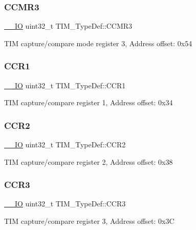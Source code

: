 \subsubsection{\texorpdfstring{CCMR3}{CCMR3}}
{\footnotesize\ttfamily \mbox{\hyperlink{core__sc300_8h_aec43007d9998a0a0e01faede4133d6be}{\+\_\+\+\_\+\+IO}} uint32\+\_\+t T\+I\+M\+\_\+\+Type\+Def\+::\+C\+C\+M\+R3}

T\+IM capture/compare mode register 3, Address offset\+: 0x54 \mbox{\label{struct_t_i_m___type_def_a0dd9c06729a5eb6179c6d0d60faca7ed}} 
\subsubsection{\texorpdfstring{CCR1}{CCR1}}
{\footnotesize\ttfamily \mbox{\hyperlink{core__sc300_8h_aec43007d9998a0a0e01faede4133d6be}{\+\_\+\+\_\+\+IO}} uint32\+\_\+t T\+I\+M\+\_\+\+Type\+Def\+::\+C\+C\+R1}

T\+IM capture/compare register 1, Address offset\+: 0x34 \mbox{\label{struct_t_i_m___type_def_a4d1171e9a61538424b8ef1f2571986d0}} 
\subsubsection{\texorpdfstring{CCR2}{CCR2}}
{\footnotesize\ttfamily \mbox{\hyperlink{core__sc300_8h_aec43007d9998a0a0e01faede4133d6be}{\+\_\+\+\_\+\+IO}} uint32\+\_\+t T\+I\+M\+\_\+\+Type\+Def\+::\+C\+C\+R2}

T\+IM capture/compare register 2, Address offset\+: 0x38 \mbox{\label{struct_t_i_m___type_def_ac83441bfb8d0287080dcbd945a272a74}} 
\subsubsection{\texorpdfstring{CCR3}{CCR3}}
{\footnotesize\ttfamily \mbox{\hyperlink{core__sc300_8h_aec43007d9998a0a0e01faede4133d6be}{\+\_\+\+\_\+\+IO}} uint32\+\_\+t T\+I\+M\+\_\+\+Type\+Def\+::\+C\+C\+R3}

T\+IM capture/compare register 3, Address offset\+: 0x3C \mbox{\label{struct_t_i_m___type_def_a5ba381c3f312fdf5e0b4119641b3b0aa}} 
